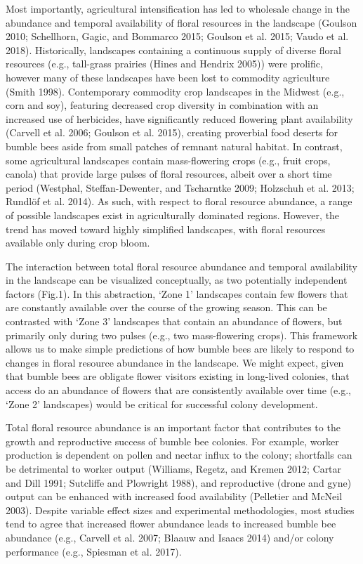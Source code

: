 \documentclass[11pt,]{article}
\begin{document}
Most importantly, agricultural intensification has led to wholesale
change in the abundance and temporal availability of floral resources in
the landscape (Goulson 2010; Schellhorn, Gagic, and Bommarco 2015;
Goulson et al. 2015; Vaudo et al. 2018). Historically, landscapes
containing a continuous supply of diverse floral resources (e.g.,
tall-grass prairies (Hines and Hendrix 2005)) were prolific, however
many of these landscapes have been lost to commodity agriculture (Smith
1998). Contemporary commodity crop landscapes in the Midwest (e.g., corn
and soy), featuring decreased crop diversity in combination with an
increased use of herbicides, have significantly reduced flowering plant
availability (Carvell et al. 2006; Goulson et al. 2015), creating
proverbial food deserts for bumble bees aside from small patches of
remnant natural habitat. In contrast, some agricultural landscapes
contain mass-flowering crops (e.g., fruit crops, canola) that provide
large pulses of floral resources, albeit over a short time period
(Westphal, Steffan-Dewenter, and Tscharntke 2009; Holzschuh et al. 2013;
Rundlöf et al. 2014). As such, with respect to floral resource
abundance, a range of possible landscapes exist in agriculturally
dominated regions. However, the trend has moved toward highly simplified
landscapes, with floral resources available only during crop bloom.

The interaction between total floral resource abundance and temporal
availability in the landscape can be visualized conceptually, as two
potentially independent factors (Fig.1). In this abstraction, `Zone 1'
landscapes contain few flowers that are constantly available over the
course of the growing season. This can be contrasted with `Zone 3'
landscapes that contain an abundance of flowers, but primarily only
during two pulses (e.g., two mass-flowering crops). This framework
allows us to make simple predictions of how bumble bees are likely to
respond to changes in floral resource abundance in the landscape. We
might expect, given that bumble bees are obligate flower visitors
existing in long-lived colonies, that access do an abundance of flowers
that are consistently available over time (e.g., `Zone 2' landscapes)
would be critical for successful colony development.

Total floral resource abundance is an important factor that contributes
to the growth and reproductive success of bumble bee colonies. For
example, worker production is dependent on pollen and nectar influx to
the colony; shortfalls can be detrimental to worker output (Williams,
Regetz, and Kremen 2012; Cartar and Dill 1991; Sutcliffe and Plowright
1988), and reproductive (drone and gyne) output can be enhanced with
increased food availability (Pelletier and McNeil 2003). Despite
variable effect sizes and experimental methodologies, most studies tend
to agree that increased flower abundance leads to increased bumble bee
abundance (e.g., Carvell et al. 2007; Blaauw and Isaacs 2014) and/or
colony performance (e.g., Spiesman et al. 2017).
\end{document}

